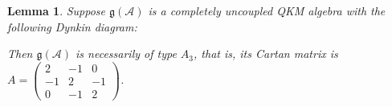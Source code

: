 \documentclass[12pt, a4paper, reqno]{amsart}
\newtheorem{lemma}{Lemma}
\theoremstyle{definition}
\theoremstyle{definition}
\theoremstyle{definition}
\numberwithin{theorem}{section}
\numberwithin{lemma}{section}
\numberwithin{remark}{section}
\numberwithin{definition}{section}
\numberwithin{corollary}{section}
\numberwithin{proposition}{section}
\numberwithin{example}{section}
\begin{document}
	
	\begin{lemma}\label{lemma-A3-diagrams}
		Suppose \(\mathfrak{g}(\mathcal{A})\) is a completely uncoupled QKM algebra with the following Dynkin diagram:
		\begin{center}
		\end{center}
		Then \(\mathfrak{g}(\mathcal{A})\) is necessarily of type \(A_3\), that is, its Cartan matrix is \(A = \begin{pmatrix}
			2 & -1 & 0 \\
			-1 & 2 & -1 \\
			0 & -1 & 2
		\end{pmatrix}\).
	\end{lemma}
\end{document}
